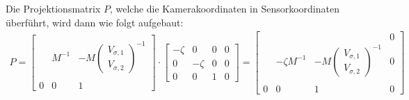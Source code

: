 		 Die Projektionsmatrix $P$, welche die Kamerakoordinaten in Sensorkoordinaten überführt, wird dann wie folgt aufgebaut:\\
		
 	\begin{gather} 		
 		P 
		=
		\begin{bmatrix}
		&&\\
		&M^{-1}& -M\begin{pmatrix}V_{\sigma,1}\\V_{\sigma,2}\end{pmatrix}^{-1}\\
		&&\\
		0&0&1
		\end{bmatrix}
		\cdot
		\begin{bmatrix}
		-\zeta&0&0&0\\
		0&-\zeta&0&0\\
		0&0&1&0
		\end{bmatrix}
		=
		\begin{bmatrix}
		&&&0\\
		&-\zeta M^{-1}& -M\begin{pmatrix}V_{\sigma,1}\\V_{\sigma,2}\end{pmatrix}^{-1}&0\\
		&&&\\
		0&0&1&0
		\end{bmatrix}
		\end{gather}
	
%
%		
		
